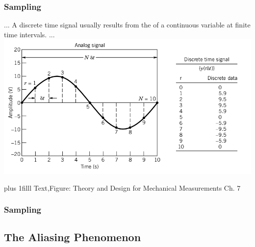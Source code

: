 \documentclass[fleqn]{beamer} %
\newcommand{\sectionIIIsubsectionItitle}{Sampling}
\newcommand{\sectionIIIsubsectionIItitle}{The Aliasing Phenomenon}
\newcommand{\btVFill}{\vskip0pt plus 1filll}
\begin{document}
			\begin{frame}
				\frametitle{\sectionIIIsubsectionItitle}

				\bigskip
						...
				A discrete time signal usually
				results from the \underline{\hspace{20mm}} of a continuous variable at \underline{\hspace{20mm}} finite time intervals.
				...	
				\includegraphics[scale=.3]{images/sampling_fig7_1.png}
			
				\btVFill
				\tiny{Text,Figure: Theory and Design for Mechanical Measurements Ch. 7}

			\end{frame}

			\begin{frame}
				\frametitle{\sectionIIIsubsectionItitle}
		
			\end{frame}

		\subsection{\sectionIIIsubsectionIItitle}\label{sectionIIIsubsectionII}	
\end{document}
